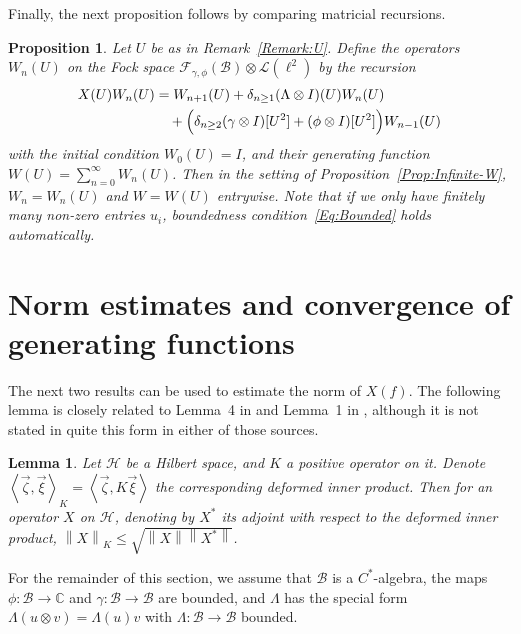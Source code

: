 \documentclass[12pt]{amsart}
\newtheorem{Prop}[Thm]{Proposition}
\newtheorem{Lemma}[Thm]{Lemma}
\theoremstyle{definition}
\newcommand{\mf}[1]{\mathbb{#1}}
\newcommand{\mc}[1]{\mathcal{#1}}
\newcommand{\ip}[2]{\left \langle{#1},{#2} \right \rangle}
\newcommand{\norm}[1]{\left \|{#1} \right \|}
\begin{document}
Finally, the next proposition follows by comparing matricial recursions.

\begin{Prop}
\label{Prop:Diagonals-W}
Let $U$ be as in Remark~\ref{Remark:U}. Define the operators $W_n(U)$ on the Fock space $\mc{F}_{\gamma, \phi}(\mc{B}) \otimes \mc{L}(\ell^2)$ by the recursion
\[
\begin{split}
X(U) W_n(U)
& = W_{n+1}(U) + \delta_{n \geq 1} (\Lambda \otimes I)(U) W_n(U) \\
& \quad + \Bigl( \delta_{n \geq 2} (\gamma \otimes I)[U^2] + (\phi \otimes I) [U^2] \Bigr) W_{n-1}(U)
\end{split}
\]
with the initial condition $W_0(U) = I$, and their generating function $W(U) = \sum_{n=0}^\infty W_n(U)$. Then in the setting of Proposition~\ref{Prop:Infinite-W}, $W_n = W_n(U)$ and $W = W(U)$ entrywise. Note that if we only have finitely many non-zero entries $u_i$, boundedness condition~\eqref{Eq:Bounded} holds automatically.
\end{Prop}



\section{Norm estimates and convergence of generating functions}
\label{Section:Norms}




The next two results can be used to estimate the norm of $X(f)$. The following lemma is closely related to Lemma~4 in \cite{BozSpeBM1} and Lemma~1 in \cite{AnsQLevy}, although it is not stated in quite this form in either of those sources.


\begin{Lemma}
\label{Lemma:Undeformed-norm}
Let $\mc{H}$ be a Hilbert space, and $K$ a positive operator on it. Denote $\ip{\vec{\zeta}}{\vec{\xi}}_K = \ip{\vec{\zeta}}{K \vec{\xi}}$ the corresponding deformed inner product. Then for an operator $X$ on $\mc{H}$, denoting by $X^\ast$ its adjoint with respect to the deformed inner product, $\norm{X}_K \leq \sqrt{\norm{X} \norm{X^\ast}}$.
\end{Lemma}


For the remainder of this section, we assume that $\mc{B}$ is a $C^\ast$-algebra, the maps $\phi : \mc{B} \rightarrow \mf{C}$ and $\gamma : \mc{B} \rightarrow \mc{B}$ are bounded, and $\Lambda$ has the special form $\Lambda(u \otimes v) = \Lambda(u) v$ with $\Lambda: \mc{B} \rightarrow \mc{B}$ bounded.
\end{document}
